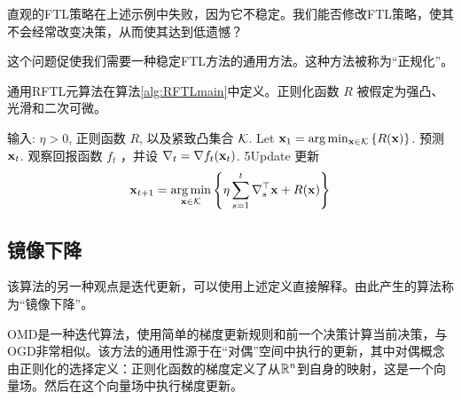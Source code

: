 直观的FTL策略在上述示例中失败，因为它不稳定。我们能否修改FTL策略，使其不会经常改变决策，从而使其达到低遗憾？

这个问题促使我们需要一种稳定FTL方法的通用方法。这种方法被称为“正规化”。

通用RFTL元算法在算法\ref{alg:RFTLmain}中定义。正则化函数 ${R}$ 被假定为强凸、光滑和二次可微。

\begin{algorithm}
	[h] \caption{
		正则化跟随领导者
		} \label{alg:RFTLmain} 
	\begin{algorithmic}[1]
		\STATE 输入: $\eta > 0$, 正则函数 ${R}$, 以及紧致凸集合 $\K$.
		\STATE Let $\xv[1]  = \arg\min_{\x \in \K} {\left\{ {R}(\x)\right\} }$.
		\STATE 预测 $\xv[t]$.
		\STATE 观察回报函数 $f_t$ ，并设 $\nabla_t = \nabla f_t(\x_t) $.
		5\STATE Update
		\STATE 更新
		\begin{align*}
			\xv[t+1] = \argmin_{\x \in \K} {\left\{\eta\sum_{s=1}^t \nabla_s^\top \x + {R}(\x)\right\}}
		\end{align*}
		\ENDFOR
	\end{algorithmic}
\end{algorithm}

\subsection{
	镜像下降
	}

该算法的另一种观点是迭代更新，可以使用上述定义直接解释。由此产生的算法称为“镜像下降”。

OMD是一种迭代算法，使用简单的梯度更新规则和前一个决策计算当前决策，与OGD非常相似。该方法的通用性源于在“对偶”空间中执行的更新，其中对偶概念由正则化的选择定义：正则化函数的梯度定义了从$\reals^n$到自身的映射，这是一个向量场。然后在这个向量场中执行梯度更新。

